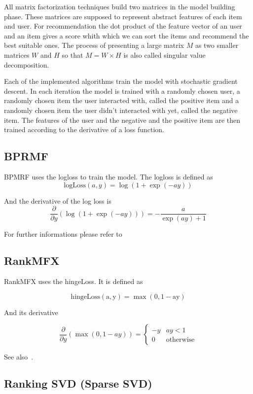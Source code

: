 All matrix factorization techniques build two matrices in the model
building phase. These matrices are supposed to represent abstract
features of each item and user. For recommendation the dot product
of the feature vector of an user and an item gives a score whith which
we can sort the items and recommend the best suitable ones. The process
of presenting a large matrix \(M\) as two smaller matrices \(W\) and \(H\) so
that \(M = W \times H\) is also called singular value decomposition.

Each of the implemented algorithms train the model with stochastic
gradient descent. In each iteration the model is trained with a randomly
chosen user, a randomly chosen item the user interacted with, called
the positive item and a randomly chosen item the user didn't interacted
with yet, called the negative item. The features of the user and the
negative and the positive item are then trained according to the derivative
of a loss function.


\subsection{BPRMF}

BPMRF uses the logloss to train the model. The logloss is defined
as
\[
\textrm{logLoss}(a,y)=\log(1+\exp(-ay))
\]


And the derivative of the log loss is
\[
\frac{\partial}{\partial y}(\log(1+\exp(-ay)))=-\frac{a}{\exp(ay)+1}
\]


For further informations please refer to~\cite{Rendle:2009:BBP:1795114.1795167}


\subsection{RankMFX}

RankMFX uses the hingeLoss. It is defined as

\[
\mathrm{\textrm{hingeLoss}(a,y)=\max(0,1-ay)}
\]


And its derivative

\[
\frac{\partial}{\partial y}(\max(0,1-ay))=\begin{cases}
-y & ay<1\\
0 & \textrm{otherwise}
\end{cases}
\]


See also~\cite{diaz2012happening}.


\subsection{Ranking SVD (Sparse SVD)}

